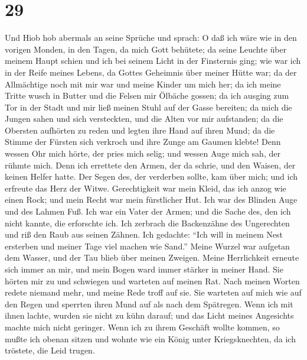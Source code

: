 \hypertarget{section-28}{%
\section{29}\label{section-28}}

 Und Hiob hob abermals an seine Sprüche und sprach:
 O daß ich wäre wie in den vorigen Monden, in den Tagen, da
mich Gott behütete;  da seine Leuchte über meinem Haupt
schien und ich bei seinem Licht in der Finsternis ging;  wie
war ich in der Reife meines Lebens, da Gottes Geheimnis über meiner
Hütte war;  da der Allmächtige noch mit mir war und meine
Kinder um mich her;  da ich meine Tritte wusch in Butter und
die Felsen mir Ölbäche gossen;  da ich ausging zum Tor in
der Stadt und mir ließ meinen Stuhl auf der Gasse bereiten; 
da mich die Jungen sahen und sich versteckten, und die Alten vor mir
aufstanden;  da die Obersten aufhörten zu reden und legten
ihre Hand auf ihren Mund;  da die Stimme der Fürsten sich
verkroch und ihre Zunge am Gaumen klebte!  Denn wessen Ohr
mich hörte, der pries mich selig; und wessen Auge mich sah, der rühmte
mich.  Denn ich errettete den Armen, der da schrie, und den
Waisen, der keinen Helfer hatte.  Der Segen des, der
verderben sollte, kam über mich; und ich erfreute das Herz der Witwe.
 Gerechtigkeit war mein Kleid, das ich anzog wie einen
Rock; und mein Recht war mein fürstlicher Hut.  Ich war des
Blinden Auge und des Lahmen Fuß.  Ich war ein Vater der
Armen; und die Sache des, den ich nicht kannte, die erforschte ich.
 Ich zerbrach die Backenzähne des Ungerechten und riß den
Raub aus seinen Zähnen.  Ich gedachte: ``Ich will in meinem
Nest ersterben und meiner Tage viel machen wie Sand.'' 
Meine Wurzel war aufgetan dem Wasser, und der Tau blieb über meinen
Zweigen.  Meine Herrlichkeit erneute sich immer an mir, und
mein Bogen ward immer stärker in meiner Hand.  Sie hörten
mir zu und schwiegen und warteten auf meinen Rat.  Nach
meinen Worten redete niemand mehr, und meine Rede troff auf sie.
 Sie warteten auf mich wie auf den Regen und sperrten ihren
Mund auf als nach dem Spätregen.  Wenn ich mit ihnen
lachte, wurden sie nicht zu kühn darauf; und das Licht meines Angesichts
machte mich nicht geringer.  Wenn ich zu ihrem Geschäft
wollte kommen, so mußte ich obenan sitzen und wohnte wie ein König unter
Kriegsknechten, da ich tröstete, die Leid trugen.

